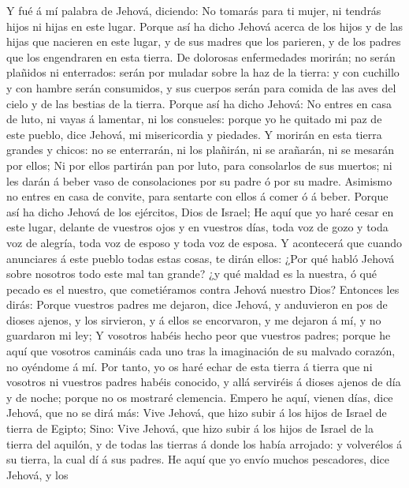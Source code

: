  Y fué á mí palabra de Jehová, diciendo:  No
tomarás para ti mujer, ni tendrás hijos ni hijas en este lugar.
 Porque así ha dicho Jehová acerca de los hijos y de las
hijas que nacieren en este lugar, y de sus madres que los parieren, y de
los padres que los engendraren en esta tierra.  De dolorosas
enfermedades morirán; no serán plañidos ni enterrados: serán por muladar
sobre la haz de la tierra: y con cuchillo y con hambre serán consumidos,
y sus cuerpos serán para comida de las aves del cielo y de las bestias
de la tierra.  Porque así ha dicho Jehová: No entres en casa
de luto, ni vayas á lamentar, ni los consueles: porque yo he quitado mi
paz de este pueblo, dice Jehová, mi misericordia y piedades.
 Y morirán en esta tierra grandes y chicos: no se
enterrarán, ni los plañirán, ni se arañarán, ni se mesarán por ellos;
 Ni por ellos partirán pan por luto, para consolarlos de sus
muertos; ni les darán á beber vaso de consolaciones por su padre ó por
su madre.  Asimismo no entres en casa de convite, para
sentarte con ellos á comer ó á beber.  Porque así ha dicho
Jehová de los ejércitos, Dios de Israel; He aquí que yo haré cesar en
este lugar, delante de vuestros ojos y en vuestros días, toda voz de
gozo y toda voz de alegría, toda voz de esposo y toda voz de esposa.
 Y acontecerá que cuando anunciares á este pueblo todas
estas cosas, te dirán ellos: ¿Por qué habló Jehová sobre nosotros todo
este mal tan grande? ¿y qué maldad es la nuestra, ó qué pecado es el
nuestro, que cometiéramos contra Jehová nuestro Dios? 
Entonces les dirás: Porque vuestros padres me dejaron, dice Jehová, y
anduvieron en pos de dioses ajenos, y los sirvieron, y á ellos se
encorvaron, y me dejaron á mí, y no guardaron mi ley;  Y
vosotros habéis hecho peor que vuestros padres; porque he aquí que
vosotros camináis cada uno tras la imaginación de su malvado corazón, no
oyéndome á mí.  Por tanto, yo os haré echar de esta tierra
á tierra que ni vosotros ni vuestros padres habéis conocido, y allá
serviréis á dioses ajenos de día y de noche; porque no os mostraré
clemencia.  Empero he aquí, vienen días, dice Jehová, que
no se dirá más: Vive Jehová, que hizo subir á los hijos de Israel de
tierra de Egipto;  Sino: Vive Jehová, que hizo subir á los
hijos de Israel de la tierra del aquilón, y de todas las tierras á donde
los había arrojado: y volverélos á su tierra, la cual dí á sus padres.
 He aquí que yo envío muchos pescadores, dice Jehová, y los
